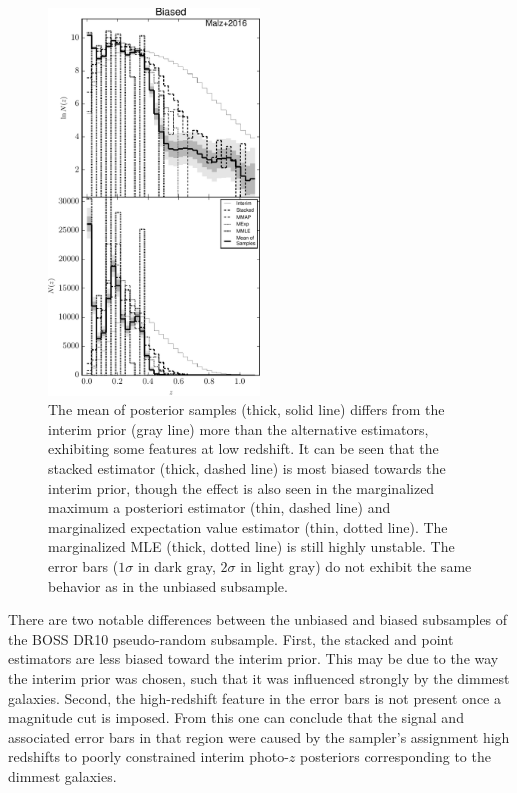 \begin{figure}
	\includegraphics[width=0.5\textwidth]{figures/chippr/bias_comps.pdf}
	\caption{The mean of posterior samples (thick, solid line) differs from the interim prior (gray line) more than the alternative estimators, exhibiting some features at low redshift.  
		It can be seen that the stacked estimator (thick, dashed line) is most biased towards the interim prior, though the effect is also seen in the marginalized maximum a posteriori estimator (thin, dashed line) and marginalized expectation value estimator (thin, dotted line).  
		The marginalized MLE (thick, dotted line) is still highly unstable.  
		The error bars ($1\sigma$ in dark gray, $2\sigma$ in light gray) do not exhibit the same behavior as in the unbiased subsample.}
\end{figure}

There are two notable differences between the unbiased and biased subsamples of the BOSS DR10 pseudo-random subsample.  
First, the stacked and point estimators are less biased toward the interim prior.  
This may be due to the way the interim prior was chosen, such that it was influenced strongly by the dimmest galaxies.  
Second, the high-redshift feature in the error bars is not present once a magnitude cut is imposed.  
From this one can conclude that the signal and associated error bars in that region were caused by the sampler's assignment high redshifts to poorly constrained interim photo-$z$ posteriors corresponding to the dimmest galaxies. 

